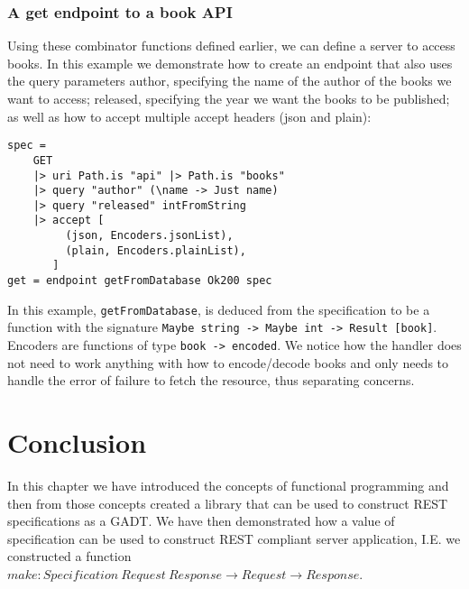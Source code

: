 \subsubsection{A get endpoint to a book API}

Using these combinator functions defined earlier, we can define a server to
access books. In this example we demonstrate how to create an endpoint that also
uses the query parameters author, specifying the name of the author of the books
we want to access; released, specifying the year we want the books to be
published; as well as how to accept multiple accept headers (json and plain):


\begin{lstlisting}
spec = 
    GET
    |> uri Path.is "api" |> Path.is "books"
    |> query "author" (\name -> Just name)
    |> query "released" intFromString
    |> accept [
         (json, Encoders.jsonList),
         (plain, Encoders.plainList),
       ]
get = endpoint getFromDatabase Ok200 spec
\end{lstlisting}

In this example, \texttt{getFromDatabase}, is deduced from the specification to
be a function with the signature \texttt{Maybe string -> Maybe int -> Result
[book]}. Encoders are functions of type \texttt{book -> encoded}. We notice how
the handler does not need to work anything with how to encode/decode books and
only needs to handle the error of failure to fetch the resource, thus separating
concerns.


\section{Conclusion}

In this chapter we have introduced the concepts of functional programming and
then from those concepts created a library that can be used to construct REST
specifications as a GADT. We have then demonstrated how a value of specification
can be used to construct REST compliant server application, I.E. we constructed
a function $make : Specification\ Request\ Response \rightarrow Request\rightarrow Response$.
